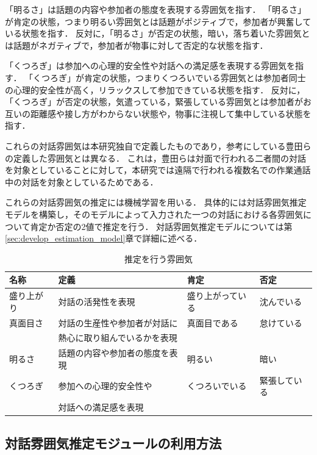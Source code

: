 「明るさ」は話題の内容や参加者の態度を表現する雰囲気を指す．
「明るさ」が肯定の状態，つまり明るい雰囲気とは話題がポジティブで，参加者が興奮している状態を指す．
反対に，「明るさ」が否定の状態，暗い，落ち着いた雰囲気とは話題がネガティブで，参加者が物事に対して否定的な状態を指す．

「くつろぎ」は参加への心理的安全性や対話への満足感を表現する雰囲気を指す．
「くつろぎ」が肯定の状態，つまりくつろいでいる雰囲気とは参加者同士の心理的安全性が高く，リラックスして参加できている状態を指す．
反対に，「くつろぎ」が否定の状態，気遣っている，緊張している雰囲気とは参加者がお互いの距離感や接し方がわからない状態や，物事に注視して集中している状態を指す．

これらの対話雰囲気は本研究独自で定義したものであり，参考にしている豊田らの定義した雰囲気とは異なる．
これは，豊田らは対面で行われる二者間の対話を対象としていることに対して，本研究では遠隔で行われる複数名での作業通話中の対話を対象としているためである．

これらの対話雰囲気の推定には機械学習を用いる．
具体的には対話雰囲気推定モデルを構築し，そのモデルによって入力された一つの対話における各雰囲気について肯定か否定の2値で推定を行う．
対話雰囲気推定モデルについては第\ref{sec:develop_estimation_model}章で詳細に述べる．

\begin{table}[t]
    \caption{推定を行う雰囲気}
    \centering
    \begin{tabular}{|l|l|l|l|}
        \hline
        名称 & 定義 & 肯定 & 否定 \\
        \hline\hline
        盛り上がり & 対話の活発性を表現 & 盛り上がっている & 沈んでいる \\
        \hline
        真面目さ & 対話の生産性や参加者が対話に & 真面目である & 怠けている \\
        & 熱心に取り組んでいるかを表現 & & \\
        \hline
        明るさ & 話題の内容や参加者の態度を表現 & 明るい & 暗い \\
        \hline
        くつろぎ  & 参加への心理的安全性や & くつろいでいる & 緊張している \\
        & 対話への満足感を表現 & & \\
        \hline
    \end{tabular}
    \label{tab:estimation_definition}
\end{table}

\subsection{対話雰囲気推定モジュールの利用方法}

